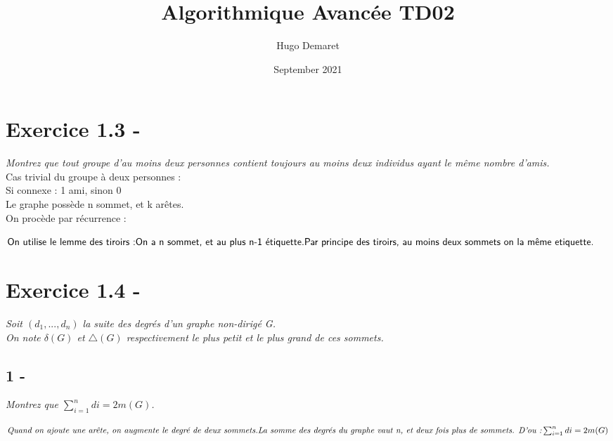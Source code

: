 \documentclass{article}
\title{Algorithmique Avancée TD02}
\author{Hugo Demaret}
\date{September 2021}
\begin{document}
\maketitle
\section*{Exercice 1.3 -}
\textit{Montrez que tout groupe d'au moins deux personnes contient toujours au moins deux individus ayant le même nombre d'amis.}\\
\textsf{Cas trivial du groupe à deux personnes :}\\
\textsf{Si connexe : 1 ami, sinon 0}\\
\textsf{Le graphe possède n sommet, et k arêtes.}\\
\textsf{On procède par récurrence :}
    \begin{center}
        $
            \textsf{On utilise le lemme des tiroirs :}
            \linebreak
            \textsf{On a n sommet, et au plus n-1 étiquette.}
            \linebreak
            \textsf{Par principe des tiroirs, au moins deux sommets on la même etiquette.}
        $
    \end{center}
\section*{Exercice 1.4 -}
    \textit{Soit $(d_{1},...,d_{n})$ la suite des degrés d'un graphe non-dirigé G.}\\
    \textit{On note $\delta(G)$ et $\bigtriangleup(G)$ respectivement le plus petit et le plus grand de ces sommets.}\\
    \subsection*{1 -}
        \textit{Montrez que $\sum_{i=1}^{n} di = 2m(G) $.}
            \begin{center}
            $
            \textit{Quand on ajoute une arête, on augmente le degré de deux sommets.}
            \linebreak
            \textit{La somme des degrés du graphe vaut n, et deux fois plus de sommets. D'ou :}
            \linebreak
            \sum_{i=1}^{n} di = 2m(G) 
            $
            \end{center}
\end{document}
